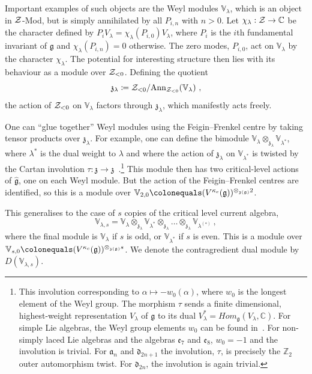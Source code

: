 \documentclass[a4paper]{article}
\def\IC{\mathbb{C}}
\def\IV{\mathbb{V}}
\def\IZ{\mathbb{Z}}
\def\ZZ{{\cal Z}}
\def\af{\mathfrak{a}}
\def\df{\mathfrak{d}}
\def\ef{\mathfrak{e}}
\def\gf{\mathfrak{g}}
\def \zf{\mathfrak{z}}
\begin{document}
Important examples of such objects are the Weyl modules $\mathbb{V}_\lambda$, which is an object in $\ZZ$-Mod, but is simply annihilated by all $P_{i,n}$ with $n >0$. Let $\chi_\lambda:\ZZ\rightarrow \IC$ be the character defined by $P_i V_{\lambda} = \chi_\lambda(P_{i,0}) V_{\lambda}$, where $P_i$ is the $i$th fundamental invariant of $\gf$ and $\chi_\lambda(P_{i,n})=0$ otherwise. The zero modes, $P_{i,0}$, act on $\IV_{\lambda}$ by the character $\chi_\lambda$.
The potential for interesting structure then lies with its behaviour as a module over $\ZZ_{<0}$. Defining the quotient
\begin{equation}\label{eq:ff_quot}
	\zf_{\lambda} \coloneqq \ZZ_{<0}/\mathrm{Ann_{\ZZ_{<0}}}(\IV_{\lambda})~,
\end{equation}
the action of $\ZZ_{<0}$ on $\IV_{\lambda}$ factors through $\zf_\lambda$, which manifestly acts freely.

One can ``glue together'' Weyl modules using the Feigin--Frenkel centre by taking tensor products over $\zf_\lambda$. For example, one can define the bimodule $\IV_{\lambda}\otimes_{\zf_\lambda} \IV_{\lambda^*}$, where $\lambda^*$ is the dual weight to $\lambda$ and where the action of $\zf_\lambda$ on $\IV_{\lambda^*}$ is twisted by the Cartan involution $\tau:\mathfrak{z}\rightarrow\mathfrak{z}$~\cite{frenkel2004}.\footnote{This involution corresponding to $\alpha\mapsto - w_0(\alpha)$, where $w_0$ is the longest element of the Weyl group. The morphism $\tau$ sends a finite dimensional, highest-weight representation $V_\lambda$ of $\gf$ to its dual $V_\lambda^* = Hom_{\gf}(V_{\lambda},\IC)$. For simple Lie algebras, the Weyl group elements $w_0$ can be found in~\cite{Bourbaki:2002}. For non-simply laced Lie algebras and the algebras $\ef_7$ and $\ef_8$, $w_0=-1$ and the involution is trivial. For $\af_n$ and $\df_{2n+1}$ the involution, $\tau$, is precisely the $\IZ_2$ outer automorphism twist. For $\df_{2n}$, the involution is again trivial.} This module then has two critical-level actions of $\hat{\gf}$, one on each Weyl module. But the action of the Feigin--Frenkel centres are identified, so this is a module over $\IV_{2,0}\colonequals (V^{\kappa_c}(\gf))^{\otimes_{\zf(\gf)}2}$.

This generalises to the case of $s$ copies of the critical level current algebra,
\begin{equation}
	\IV_{\lambda,s} = \IV_{\lambda}\otimes_{\zf_\lambda}\IV_{\lambda^*}\otimes_{\zf_\lambda}\dots\otimes_{\zf_\lambda}\IV_{\lambda^{(*)}}~,
\end{equation}
where the final module is $\IV_{\lambda}$ if $s$ is odd, or $\IV_{\lambda^*}$ if $s$ is even. This is a module over $\IV_{s,0}\colonequals	 (V^{\kappa_c}(\gf))^{\otimes_{\zf(\gf)}s}$. We denote the contragredient dual module by $D(\IV_{\lambda,s})$. 
\end{document}

